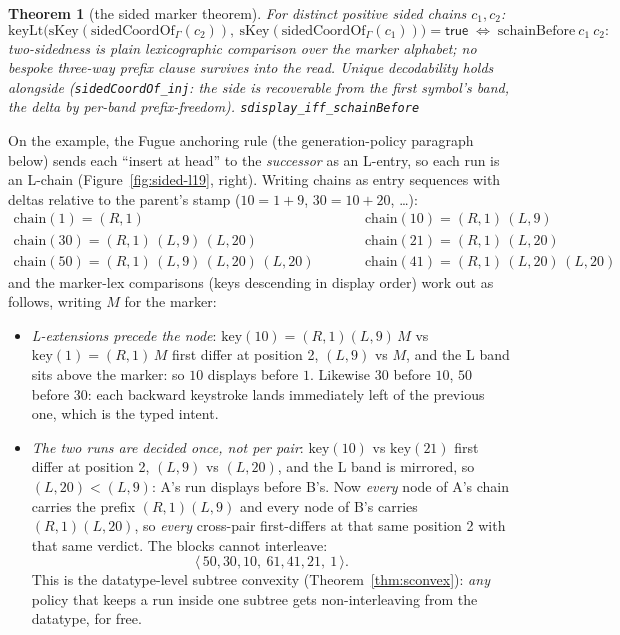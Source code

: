 \documentclass[11pt]{article}
\newtheorem{theorem}{Theorem}[section]
\newcommand{\lean}[1]{\texttt{#1}}
\newcommand{\chain}{\mathrm{chain}}
\begin{document}
\begin{theorem}[the sided marker theorem]
\label{thm:sidedmarker}
For distinct positive sided chains $c_1, c_2$:
\[
  \mathrm{keyLt}\bigl(\mathrm{sKey}(\mathrm{sidedCoordOf}_\Gamma(c_2)),\
  \mathrm{sKey}(\mathrm{sidedCoordOf}_\Gamma(c_1))\bigr) =
  \mathsf{true}
  \;\iff\; \mathrm{schainBefore}\ c_1\ c_2 :
\]
two-sidedness is plain lexicographic comparison over the marker
alphabet; no bespoke three-way prefix clause survives into the read.
Unique decodability holds alongside (\lean{sidedCoordOf\_inj}: the
side is recoverable from the first symbol's band, the delta by
per-band prefix-freedom).
\hfill\lean{sdisplay\_iff\_schainBefore}
\end{theorem}

On the example, the Fugue anchoring rule (the generation-policy
paragraph below) sends each ``insert at head'' to the \emph{successor}
as an L-entry, so each run is an L-chain
(Figure~\ref{fig:sided-l19}, right). Writing chains as
entry sequences with deltas relative to the parent's stamp
($10 = 1 + 9$, $30 = 10 + 20$, \dots):
\[
\begin{array}{lcl}
  \chain(1)  = (R,1) &\qquad&
  \chain(10) = (R,1)\,(L,9) \\
  \chain(30) = (R,1)\,(L,9)\,(L,20) &&
  \chain(21) = (R,1)\,(L,20) \\
  \chain(50) = (R,1)\,(L,9)\,(L,20)\,(L,20) &&
  \chain(41) = (R,1)\,(L,20)\,(L,20)
\end{array}
\]
and the marker-lex comparisons (keys descending in display order) work
out as follows, writing $M$ for the marker:
\begin{itemize}
\item \emph{L-extensions precede the node}: $\mathrm{key}(10) =
  (R,1)(L,9)\,M$ vs $\mathrm{key}(1) = (R,1)\,M$ first differ at
  position 2, $(L,9)$ vs $M$, and the L band sits above the marker: so
  $10$ displays before $1$. Likewise $30$ before $10$, $50$ before
  $30$: each backward keystroke lands immediately left of the previous
  one, which is the typed intent.
\item \emph{The two runs are decided once, not per pair}:
  $\mathrm{key}(10)$ vs $\mathrm{key}(21)$ first differ at position 2,
  $(L,9)$ vs $(L,20)$, and the L band is mirrored, so $(L,20) <
  (L,9)$: A's run displays before B's. Now \emph{every} node of A's
  chain carries the prefix $(R,1)(L,9)$ and every node of B's carries
  $(R,1)(L,20)$, so \emph{every} cross-pair first-differs at that same
  position 2 with that same verdict. The blocks cannot interleave:
  \[
    \langle\, 50, 30, 10,\ 61, 41, 21,\ 1 \,\rangle .
  \]
  This is the datatype-level subtree convexity
  (Theorem~\ref{thm:sconvex}): \emph{any} policy that keeps a run
  inside one subtree gets non-interleaving from the datatype, for
  free.
\end{itemize}
\end{document}
